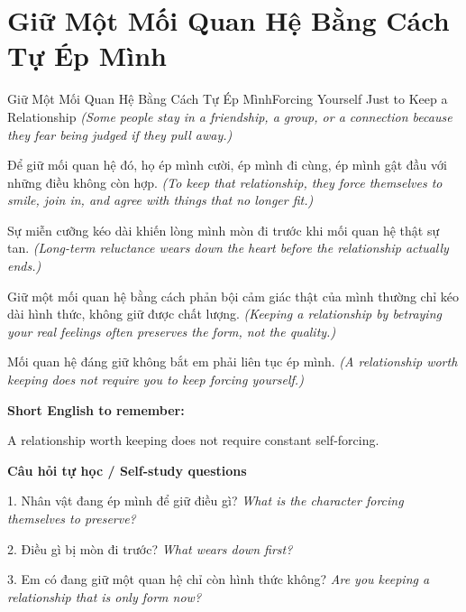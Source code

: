 \section{Giữ Một Mối Quan Hệ Bằng Cách Tự Ép Mình}
\begin{truyen}{Giữ Một Mối Quan Hệ Bằng Cách Tự Ép Mình}{Forcing Yourself Just to Keep a Relationship}
\textit{(Some people stay in a friendship, a group, or a connection because they fear being judged if they pull away.)}

Để giữ mối quan hệ đó, họ ép mình cười, ép mình đi cùng, ép mình gật đầu với những điều không còn hợp.
\textit{(To keep that relationship, they force themselves to smile, join in, and agree with things that no longer fit.)}

Sự miễn cưỡng kéo dài khiến lòng mình mòn đi trước khi mối quan hệ thật sự tan.
\textit{(Long-term reluctance wears down the heart before the relationship actually ends.)}

Giữ một mối quan hệ bằng cách phản bội cảm giác thật của mình thường chỉ kéo dài hình thức, không giữ được chất lượng.
\textit{(Keeping a relationship by betraying your real feelings often preserves the form, not the quality.)}

\end{truyen}

\begin{baihoc}
Mối quan hệ đáng giữ không bắt em phải liên tục ép mình.
\textit{(A relationship worth keeping does not require you to keep forcing yourself.)}
\end{baihoc}

\begin{ghinhoanh}
\textbf{Short English to remember:}

A relationship worth keeping does not require constant self-forcing.

\end{ghinhoanh}

\begin{tuhocnhanh}
\textbf{Câu hỏi tự học / Self-study questions}

1. Nhân vật đang ép mình để giữ điều gì? \textit{What is the character forcing themselves to preserve?}

2. Điều gì bị mòn đi trước? \textit{What wears down first?}

3. Em có đang giữ một quan hệ chỉ còn hình thức không? \textit{Are you keeping a relationship that is only form now?}
\end{tuhocnhanh}
\ngancach

